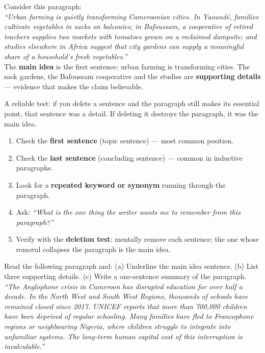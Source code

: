 \documentclass[11pt]{article}
\begin{document}
\begin{exemplebox}
Consider this paragraph:\\
\emph{``Urban farming is quietly transforming Cameroonian cities. In Yaound\'e, families cultivate vegetables in sacks on balconies; in Bafoussam, a cooperative of retired teachers supplies two markets with tomatoes grown on a reclaimed dumpsite; and studies elsewhere in Africa suggest that city gardens can supply a meaningful share of a household's fresh vegetables.''}\\
The \textbf{main idea} is the first sentence: urban farming is transforming cities. The sack gardens, the Bafoussam cooperative and the studies are \textbf{supporting details} --- evidence that makes the claim believable.
\end{exemplebox}

A reliable test: if you delete a sentence and the paragraph still makes its essential point, that sentence was a detail. If deleting it destroys the paragraph, it was the main idea.

\begin{methode}
\begin{enumerate}
\item Check the \textbf{first sentence} (topic sentence) --- most common position.
\item Check the \textbf{last sentence} (concluding sentence) --- common in inductive paragraphs.
\item Look for a \textbf{repeated keyword or synonym} running through the paragraph.
\item Ask: \emph{``What is the one thing the writer wants me to remember from this paragraph?''}
\item Verify with the \textbf{deletion test}: mentally remove each sentence; the one whose removal collapses the paragraph is the main idea.
\end{enumerate}
\end{methode}

\begin{exercice}
Read the following paragraph and: (a) Underline the main idea sentence. (b) List three supporting details. (c) Write a one-sentence summary of the paragraph.\\
\emph{``The Anglophone crisis in Cameroon has disrupted education for over half a decade. In the North West and South West Regions, thousands of schools have remained closed since 2017. UNICEF reports that more than 700,000 children have been deprived of regular schooling. Many families have fled to Francophone regions or neighbouring Nigeria, where children struggle to integrate into unfamiliar systems. The long-term human capital cost of this interruption is incalculable.''}
\end{exercice}
\end{document}
